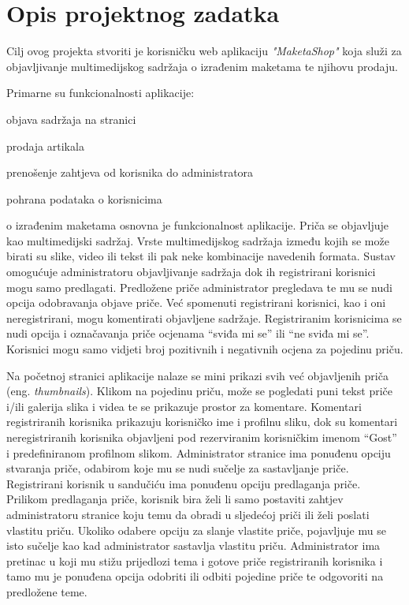 \chapter{Opis projektnog zadatka}

		Cilj ovog projekta stvoriti je korisničku web aplikaciju \textit{"MaketaShop"} koja služi za objavljivanje multimedijskog sadržaja o izrađenim maketama te njihovu prodaju.
		
		Primarne su funkcionalnosti aplikacije: 
		\begin{packed_item}
			
			\item  objava sadržaja na stranici
			\item  prodaja artikala
			\item  prenošenje zahtjeva od korisnika do administratora
			\item  pohrana podataka o korisnicima
			
		\end{packed_item}
		
		
		 o izrađenim maketama osnovna je funkcionalnost aplikacije. Priča se objavljuje kao multimedijski sadržaj. Vrste multimedijskog sadržaja između kojih se može birati su slike, video ili tekst ili pak neke kombinacije navedenih formata. Sustav omogućuje administratoru objavljivanje sadržaja dok ih registrirani korisnici mogu samo predlagati. Predložene priče administrator pregledava te mu se nudi opcija odobravanja objave priče. Već spomenuti registrirani korisnici, kao i oni neregistrirani, mogu komentirati objavljene sadržaje. Registriranim korisnicima se nudi opcija i označavanja priče ocjenama “sviđa mi se” ili “ne sviđa mi se”. Korisnici mogu samo vidjeti broj pozitivnih i negativnih ocjena za pojedinu priču.
		
		Na početnoj stranici aplikacije nalaze se mini prikazi svih već objavljenih priča (eng. \textit{thumbnails}). Klikom na pojedinu priču, može se pogledati puni tekst priče i/ili galerija slika i videa te se prikazuje prostor za komentare. Komentari registriranih korisnika prikazuju korisničko ime i profilnu sliku, dok su komentari neregistriranih korisnika objavljeni pod rezerviranim korisničkim imenom “Gost” i predefiniranom profilnom slikom. Administrator stranice ima ponuđenu opciju stvaranja priče, odabirom koje mu se nudi sučelje za sastavljanje priče. Registrirani korisnik u sandučiću ima ponuđenu opciju predlaganja priče. Prilikom predlaganja priče, korisnik bira želi li samo postaviti zahtjev administratoru stranice koju temu da obradi u sljedećoj priči ili želi poslati vlastitu priču. Ukoliko odabere opciju za slanje vlastite priče, pojavljuje mu se isto sučelje kao kad administrator sastavlja vlastitu priču. Administrator ima pretinac u koji mu stižu prijedlozi tema i gotove priče registriranih korisnika i tamo mu je ponuđena opcija odobriti ili odbiti pojedine priče te odgovoriti na predložene teme. 
		
